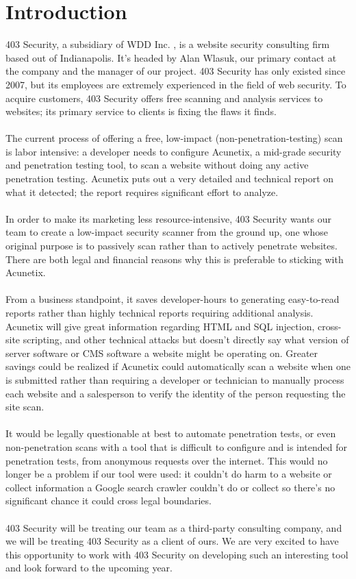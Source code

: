 \section{Introduction}
	403 Security, a subsidiary of WDD Inc. , is a website security consulting firm based out of Indianapolis.  It’s headed by Alan Wlasuk, our primary contact at the company and the manager of our project. 403 Security has only existed  since 2007, but its employees are extremely experienced in the field of web security. To acquire customers, 403 Security offers free scanning and analysis services to websites; its primary service to clients is fixing the flaws it finds.\\\\
The current process of offering a free, low-impact (non-penetration-testing) scan is labor intensive: a developer needs to configure Acunetix, a mid-grade security and penetration testing tool, to scan a website without doing any active penetration testing. Acunetix puts out a very detailed and technical report on what it detected; the report requires significant effort to analyze.\\\\
In order to make its marketing less resource-intensive, 403 Security wants our team to create a low-impact security scanner from the ground up, one whose original purpose is to passively scan rather than to actively penetrate websites. There are both legal and financial reasons why this is preferable to sticking with Acunetix.\\\\
From a business standpoint, it saves developer-hours to  generating easy-to-read reports rather than highly technical reports requiring additional analysis. Acunetix will give great information regarding HTML and SQL injection, cross-site scripting, and other technical attacks but doesn’t directly say what version of server software or CMS software a website might be operating on. Greater savings could be realized if Acunetix could automatically scan a website when one is submitted rather than requiring a developer or technician to manually process each website and a salesperson to verify the identity of the person requesting the site scan.\\\\
 It would be legally questionable at best to automate penetration tests, or even non-penetration scans with a tool that is difficult to configure and is intended for penetration tests, from anonymous requests over the internet. This would no longer be a problem if our tool were used: it couldn’t do harm to a website or collect information a Google search crawler couldn’t do or collect so there’s no significant chance it could cross legal boundaries.\\\\
403 Security will be treating our team as a third-party consulting company, and we will be treating 403 Security as a client of ours. We are very excited to have this opportunity to work with 403 Security on developing such an interesting tool and look forward to the upcoming year.